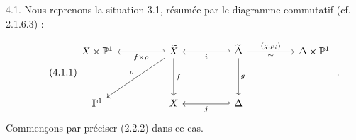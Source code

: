 4.1. Nous reprenons la situation 3.1, résumée par le diagramme commutatif (cf. 2.1.6.3) :

\begin{equation}\tag{4.1.1}
\begin{tikzcd}[row sep=huge, column sep=huge]
X \times \mathbb{P}^{1} & \widetilde{X} \arrow[l, hook', "f \times \rho"] \arrow[d, "f"] \arrow[dl, "\rho"'] & \widetilde{\Delta} \arrow[l, hook', "i"] \arrow[d, "g"] \arrow[r, "{(g,\rho_{i})}", "\sim"'] & \Delta \times \mathbb{P}^{1} \\
\mathbb{P}^{1} & X & \Delta \arrow[l, hook', "j"]
\end{tikzcd}\;.
\end{equation}
Commençons par préciser (2.2.2) dans ce cas.

